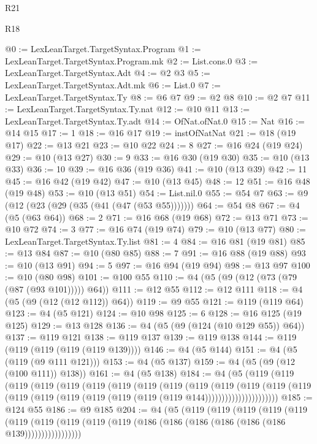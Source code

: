 \begin{lexlean}{R21}
\begin{lexlean}{R18}
\begin{coremodule}
{{{{{{{{{{{{{{{{{{{{{{{{{{{{{{{{{{{{{{{{{{{{{{{{{{{{{{{{{{{{{{{{{{{{{{{{{{{{{{{{{{{{{{{{{{{{{{{{{{{{{{{{{{{{{{{{{{{{{{{{{{{{@0 := LexLeanTarget.TargetSyntax.Program
@1 := LexLeanTarget.TargetSyntax.Program.mk
@2 := List.cons.{0}
@3 := LexLeanTarget.TargetSyntax.Adt
@4 := @2 @3
@5 := LexLeanTarget.TargetSyntax.Adt.mk
@6 := List.{0}
@7 := LexLeanTarget.TargetSyntax.Ty
@8 := @6 @7
@9 := @2 @8
@10 := @2 @7
@11 := LexLeanTarget.TargetSyntax.Ty.nat
@12 := @10 @11
@13 := LexLeanTarget.TargetSyntax.Ty.adt
@14 := OfNat.ofNat.{0}
@15 := Nat
@16 := @14 @15
@17 := 1
@18 := @16 @17
@19 := instOfNatNat
@21 := @18 (@19 @17)
@22 := @13 @21
@23 := @10 @22
@24 := 8
@27 := @16 @24 (@19 @24)
@29 := @10 (@13 @27)
@30 := 9
@33 := @16 @30 (@19 @30)
@35 := @10 (@13 @33)
@36 := 10
@39 := @16 @36 (@19 @36)
@41 := @10 (@13 @39)
@42 := 11
@45 := @16 @42 (@19 @42)
@47 := @10 (@13 @45)
@48 := 12
@51 := @16 @48 (@19 @48)
@53 := @10 (@13 @51)
@54 := List.nil.{0}
@55 := @54 @7
@63 := @9 (@12 (@23 (@29 (@35 (@41 (@47 (@53 @55)))))))
@64 := @54 @8
@67 := @4 (@5 (@63 @64))
@68 := 2
@71 := @16 @68 (@19 @68)
@72 := @13 @71
@73 := @10 @72
@74 := 3
@77 := @16 @74 (@19 @74)
@79 := @10 (@13 @77)
@80 := LexLeanTarget.TargetSyntax.Ty.list
@81 := 4
@84 := @16 @81 (@19 @81)
@85 := @13 @84
@87 := @10 (@80 @85)
@88 := 7
@91 := @16 @88 (@19 @88)
@93 := @10 (@13 @91)
@94 := 5
@97 := @16 @94 (@19 @94)
@98 := @13 @97
@100 := @10 (@80 @98)
@101 := @100 @55
@110 := @4 (@5 (@9 (@12 (@73 (@79 (@87 (@93 @101))))) @64))
@111 := @12 @55
@112 := @12 @111
@118 := @4 (@5 (@9 (@12 (@12 @112)) @64))
@119 := @9 @55
@121 := @119 (@119 @64)
@123 := @4 (@5 @121)
@124 := @10 @98
@125 := 6
@128 := @16 @125 (@19 @125)
@129 := @13 @128
@136 := @4 (@5 (@9 (@124 (@10 @129 @55)) @64))
@137 := @119 @121
@138 := @119 @137
@139 := @119 @138
@144 := @119 (@119 (@119 (@119 (@119 @139))))
@146 := @4 (@5 @144)
@151 := @4 (@5 (@119 (@9 @111 @121)))
@153 := @4 (@5 @137)
@159 := @4 (@5 (@9 (@12 (@100 @111)) @138))
@161 := @4 (@5 @138)
@184 := @4
    (@5
      (@119
        (@119
          (@119
            (@119
              (@119
                (@119
                  (@119
                    (@119
                      (@119
                        (@119
                          (@119
                            (@119
                              (@119
                                (@119
                                  (@119
                                    (@119 (@119 (@119 (@119 (@119 (@119 @144))))))))))))))))))))))
@185 := @124 @55
@186 := @9 @185
@204 := @4
    (@5
      (@119
        (@119
          (@119
            (@119
              (@119
                (@119
                  (@119 (@119 (@119 (@119 (@186 (@186 (@186 (@186 (@186 (@186 @139)))))))))))))))))
}}}}}}}}}}}}}}}}}}}}}}}}}}}}}}}}}}}}}}}}}}}}}}}}}}}}}}}}}}}}}}}}}}}}}}}}}}}}}}}}}}}}}}}}}}}}}}}}}}}}}}}}}}}}}}}}}}}}}}}}}}}}
\end{coremodule}
\end{lexlean}
\end{lexlean}
